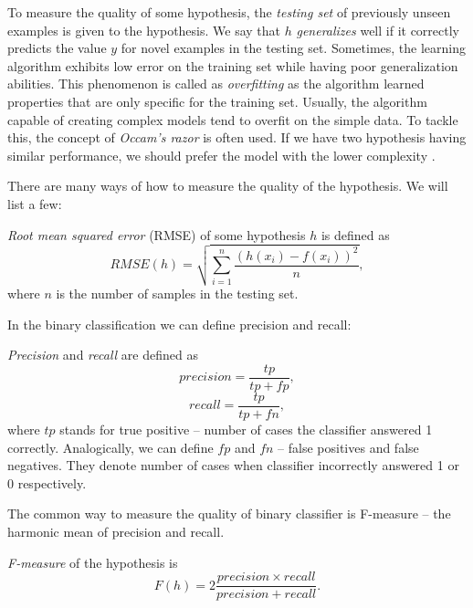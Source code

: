 To measure the quality of some hypothesis, the \emph{testing set} of previously unseen examples is given to the hypothesis. We say that $h$ \emph{generalizes} well if it correctly predicts the value $y$ for novel examples in the testing set. Sometimes, the learning algorithm exhibits low error on the training set while having poor generalization abilities. This phenomenon is called as \emph{overfitting} as the algorithm learned properties that are only specific for the training set. Usually, the algorithm capable of creating complex models tend to overfit on the simple data. To tackle this, the concept of \emph{ Occam's razor} is often used. If we have two hypothesis having similar performance, we should prefer the model with the lower complexity \cite{aima3ed}.

There are many ways of how to measure the quality of the hypothesis. We will list a few:

\begin{definition}
	\emph{Root mean squared error} (RMSE) of some hypothesis $h$ is defined as 
	\begin{equation*}
	RMSE(h)=\sqrt{\sum_{i=1}^{n}\frac{(h(x_i)-f(x_i))^2}{n}},
	\end{equation*}
	where $n$ is the number of samples in the testing set.
\end{definition}


In the binary classification we can define precision and recall:
\begin{definition}
	\emph{Precision} and \emph{recall} are defined as
	\begin{equation*}
	precision = \frac{tp}{tp+fp},
	\end{equation*}
	\begin{equation*}
	recall = \frac{tp}{tp+fn},
	\end{equation*}
	where $tp$ stands for true positive -- number of cases the classifier answered 1 correctly. Analogically, we can define $fp$ and $fn$ -- false positives and false negatives. They denote number of cases when classifier incorrectly answered 1 or 0 respectively.
\end{definition}
The common way to measure the quality of binary classifier is F-measure -- the harmonic mean of precision and recall.
\begin{definition}
	\emph{F-measure} of the hypothesis is
	\begin{equation*}
	F(h)=2\frac{precision\times recall}{precision+recall}.
	\end{equation*}
\end{definition}

